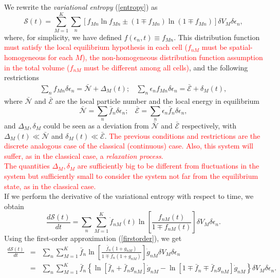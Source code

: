 \documentclass{article}
\newcommand{\de}{\delta}
\newcommand{\Ss}{\mathcal{S}}
\begin{document}
We rewrite the \textit{variational entropy} (\ref{entropy}) as
\begin{equation}
    \Ss(t)=\sum_{M=1}^{K} \sum_{n} \left[ f_{Mn} \ln f_{Mn} \pm (1 \mp f_{Mn}) \ln (1 \mp f_{Mn}) \right] \de V_M \delta \epsilon_n \label{entropy2},
\end{equation}
where, for simplicity, we have defined $f(\epsilon_{n},t)\equiv f_{Mn}$.
This distribution function \textcolor{red}{must satisfy the local equilibrium hypothesis in each cell ($f_{nM}$ must be spatial-homogeneous for each $M$), the non-homogeneous distribution function assumption in the total volume ($f_{nM}$ must be different among all cells)}, and the following restrictions
\begin{eqnarray}
        \sum_{n}f_{Mn} \delta \epsilon_n=\bar{\mathcal{N}}+\Delta_M(t); \ \ \ \ \sum_{n}\epsilon_{n}f_{Mn} \delta \epsilon_n=\bar{\mathcal{E}}+ \delta_M(t), \label{restrictionoutside}
  \end{eqnarray}
  where $\bar {\mathcal{N}}$ and $\bar{\mathcal{E}}$ are the local particle number and the local energy in equilibrium
  \begin{equation}
      \bar{\mathcal{N}}= \sum_n \bar{f}_n \delta \epsilon_n; \ \ \ \ \bar{\mathcal{E}}= \sum_n \epsilon_n\bar{f}_n \delta \epsilon_n,
  \end{equation}
  and $\Delta_M,\delta_M$ could be seen as a deviation from $\bar{\mathcal{N}}$ and $\bar{\mathcal{E}}$ respectively, with $\Delta_M(t)\ll \bar{\mathcal{N}}$ and $\delta_M(t) \ll \bar{\mathcal{E}}$. \textcolor{red}{The previous conditions and restrictions are the discrete analogous case of the classical (continuous) case. Also, this system will suffer, as in the classical case, a \textit{relaxation process}.\\
  The quantities $\Delta_M,\delta_M$ are sufficiently big to be different from fluctuations in the system but sufficiently small to consider the system not far from the equilibrium state, as in the classical case.}  \\
If we perform the derivative of the variational entropy with respect to time, we obtain
\begin{equation}
   \frac{d \Ss (t)}{dt}= \sum_n \sum_{M=1}^{K} \dot{f}_{nM}(t)\ln \left[ \frac{f_{nM}(t)}{1\mp f_{nM}(t)} \right] \de V_M \delta \epsilon_n.\label{deltaH}
\end{equation}{}
Using the first-order approximation (\ref{firstorder}), we get
\begin{eqnarray}
    \frac{d\Ss (t)}{dt}&=&\sum_n \sum_{M=1}^{K} \bar{f}_{n}\ln \left[ \frac{\bar{f}_{n}(1+g_{nM})}{1\mp \bar{f}_{n} (1+ g_{nM})} \right]\dot{g}_{nM} \de V_M\delta \epsilon_n \nonumber \\
    &=&\sum_n \sum_{M=1}^{K} \bar{f}_n \left \{ \ln [\bar{f}_n+\bar{f}_n g_{nM}]\dot{g}_{nM}-\ln [1\mp\bar{f}_n\mp\bar{f}_n g_{nM}]\dot{g}_{nM}  \right \}\de V_M \delta \epsilon_n.\nonumber \\
    \label{cambioH1}
\end{eqnarray}{}
\end{document}
